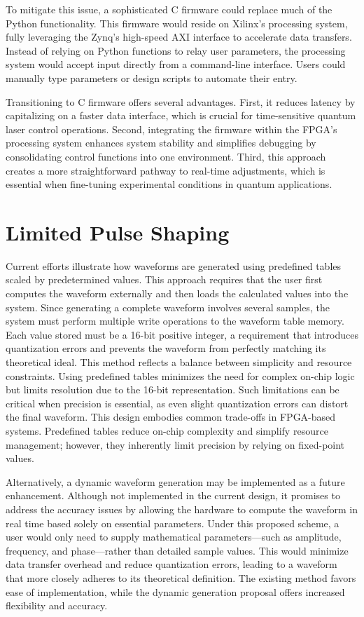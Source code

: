 To mitigate this issue, a sophisticated C firmware could replace much of the Python functionality. This firmware would reside on Xilinx's processing system, fully leveraging the Zynq's high-speed AXI interface to accelerate data transfers. Instead of relying on Python functions to relay user parameters, the processing system would accept input directly from a command-line interface. Users could manually type parameters or design scripts to automate their entry.

Transitioning to C firmware offers several advantages. First, it reduces latency by capitalizing on a faster data interface, which is crucial for time-sensitive quantum laser control operations. Second, integrating the firmware within the FPGA's processing system enhances system stability and simplifies debugging by consolidating control functions into one environment. Third, this approach creates a more straightforward pathway to real-time adjustments, which is essential when fine-tuning experimental conditions in quantum applications.

\section{Limited Pulse Shaping}

Current efforts illustrate how waveforms are generated using predefined tables scaled by predetermined values. This approach requires that the user first computes the waveform externally and then loads the calculated values into the system. Since generating a complete waveform involves several samples, the system must perform multiple write operations to the waveform table memory. Each value stored must be a 16-bit positive integer, a requirement that introduces quantization errors and prevents the waveform from perfectly matching its theoretical ideal. This method reflects a balance between simplicity and resource constraints. Using predefined tables minimizes the need for complex on-chip logic but limits resolution due to the 16-bit representation. Such limitations can be critical when precision is essential, as even slight quantization errors can distort the final waveform. This design embodies common trade-offs in FPGA-based systems. Predefined tables reduce on-chip complexity and simplify resource management; however, they inherently limit precision by relying on fixed-point values.

Alternatively, a dynamic waveform generation may be implemented as a future enhancement. Although not implemented in the current design, it promises to address the accuracy issues by allowing the hardware to compute the waveform in real time based solely on essential parameters. Under this proposed scheme, a user would only need to supply mathematical parameters—such as amplitude, frequency, and phase—rather than detailed sample values. This would minimize data transfer overhead and reduce quantization errors, leading to a waveform that more closely adheres to its theoretical definition. The existing method favors ease of implementation, while the dynamic generation proposal offers increased flexibility and accuracy.

